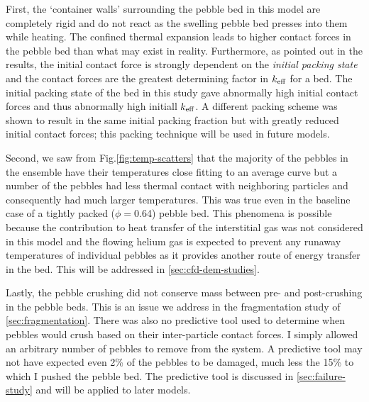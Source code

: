 First, the `container walls' surrounding the pebble bed in this model are completely rigid and do not react as the swelling pebble bed presses into them while heating. The confined thermal expansion leads to higher contact forces in the pebble bed than what may exist in reality. Furthermore, as pointed out in the results, the initial contact force is strongly dependent on the \textit{initial packing state} and the contact forces are the greatest determining factor in $k_\text{eff}$ for a bed. The initial packing state of the bed in this study gave abnormally high initial contact forces and thus abnormally high initiall $k_\text{eff}$. A different packing scheme was shown to result in the same initial packing fraction but with greatly reduced initial contact forces; this packing technique will be used in future models. 

Second, we saw from Fig.\ref{fig:temp-scatters} that the majority of the pebbles in the ensemble have their temperatures close fitting to an average curve but a number of the pebbles had less thermal contact with neighboring particles and consequently had much larger temperatures. This was true even in the baseline case of a tightly packed ($\phi =$\num{0.64}) pebble bed. This phenomena is possible because the contribution to heat transfer of the interstitial gas was not considered in this model and the flowing helium gas is expected to prevent any runaway temperatures of individual pebbles as it provides another route of energy transfer in the bed. This will be addressed in \cref{sec:cfd-dem-studies}.

Lastly, the pebble crushing did not conserve mass between pre- and post-crushing in the pebble beds. This is an issue we address in the fragmentation study of \cref{sec:fragmentation}. There was also no predictive tool used to determine when pebbles would crush based on their inter-particle contact forces. I simply allowed an arbitrary number of pebbles to remove from the system. A predictive tool may not have expected even 2\% of the pebbles to be damaged, much less the 15\% to which I pushed the pebble bed. The predictive tool is discussed in \cref{sec:failure-study} and will be applied to later models.

